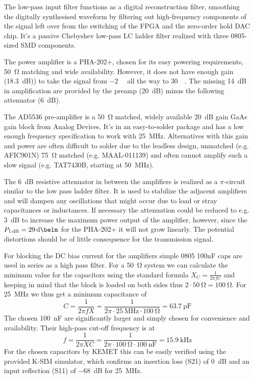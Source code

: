 The low-pass input filter functions as a digital reconstruction filter, smoothing the digitally synthesised waveform by filtering out high-frequency components of the signal left over from the switching of the FPGA and the zero-order hold DAC chip. It's a passive Chebyshev low-pass LC ladder filter realized with three 0805-sized SMD components.

The power amplifier is a PHA-202+, chosen for its easy powering requirements, \qty{50}{\ohm} matching and wide availability. However, it does not have enough gain (\qty{18.3}{\deci\bel})) to take the signal from \qty{-2}{\deci\belm} all the way to \qty{+30}{\deci\belm}. The missing \qty{14}{\deci\bel} in amplification are provided by the preamp (\qty{20}{\deci\bel}) minus the following attenuator (\qty{6}{\deci\bel}).

The AD5536 pre-amplifier is a \qty{50}{\ohm} matched, widely available \qty{20}{\deci\bel} gain GaAs gain block from Analog Devices. It's in an easy-to-solder package and has a low enough frequency specification to work with \qty{25}{\mega\hertz}. Alternatives with this gain and power are often difficult to solder due to the leadless design, unmatched (e.g. AFIC901N) \qty{75}{\ohm} matched (e.g. MAAL-011139) and often cannot amplify such a slow signal (e.g. TAT7430B, starting at \qty{50}{\mega\hertz}).

The \qty{6}{\deci\bel} resistive attenuator in between the amplifiers is realized as a \(\pi\)-circuit similar to the low pass ladder filter. It is used to stabilize the adjacent amplifiers and will dampen any oscillations that might occur due to load or stray capacitances or inductances. If necessary the attenuation could be reduced to e.g. \qty{3}{\deci\bel} to increase the maximum power output of the amplifier, however, since the \(P_{\qty{1}{\deci\bel}} = \qty{29}{\deci\belm}\) for the PHA-202+ it will not grow linearly. The potential distortions should be of little consequence for the transmission signal.

For blocking the DC bias current for the amplifiers simple 0805 100nF caps are used in series as a high pass filter. For a \qty{50}{\ohm} system we can calculate the minimum value for the capacitors using the standard formula \(X_C = \frac{1}{2\pi{}fC}\) and keeping in mind that the block is loaded on both sides thus \( 2 \cdot \qty{50}{\ohm} = \qty{100}{\ohm}\). For \qty{25}{\mega\hertz} we thus get a minimum capacitance of
\[
    C = \frac{1}{2\pi{}fX} = \frac{1}{2\pi{} \cdot{} \qty{25}{\mega\hertz} \cdot{} \qty{100}{\ohm}} = \qty{63.7}{\pico\farad}
\]
The chosen \qty{100}{\nano\farad} are significantly larger and simply chosen for convenience and availability. Their high-pass cut-off frequency is at
\[
    f = \frac{1}{2\pi{}XC} = \frac{1}{2\pi{} \cdot{} \qty{100}{\ohm} \cdot{} \qty{100}{\nano\farad}} = \qty{15.9}{\kilo\hertz}
\]
For the chosen capacitors by KEMET this can be easily verified using the provided K-SIM simulator, which confirms an insertion loss (S21) of \qty{0}{\deci\bel} and an input reflection (S11) of \qty{-68}{\deci\bel} for \qty{25}{\mega\hertz}.

